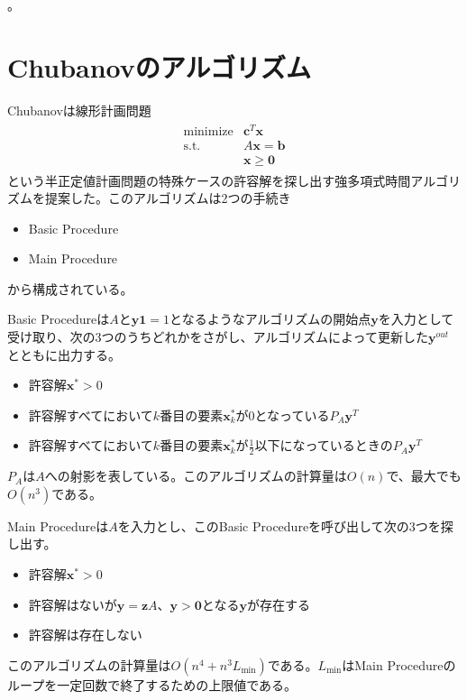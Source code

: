 。

\section{Chubanovのアルゴリズム}
Chubanovは線形計画問題
\begin{align*}
  \begin{array}{ll}
    \text{minimize} & \mathbf{c}^T \mathbf{x} \\
    \text{s.t.}     & A \mathbf{x} = \mathbf{b} \\
                    & \mathbf{x} \geq \mathbf{0}
  \end{array}
\end{align*}
という半正定値計画問題の特殊ケースの許容解を探し出す強多項式時間アルゴリズムを提案した。このアルゴリズムは2つの手続き
\begin{itemize}
  \item Basic Procedure
  \item Main Procedure
\end{itemize}
から構成されている。

Basic Procedureは$A$と$\mathbf{y} \mathbf{1} = 1$となるようなアルゴリズムの開始点$\mathbf{y}$を入力として受け取り、次の3つのうちどれかをさがし、アルゴリズムによって更新した$\mathbf{y}^{out}$とともに出力する。
\begin{itemize}
  \item 許容解$\mathbf{x}^* > 0$
  \item 許容解すべてにおいて$k$番目の要素$\mathbf{x}_k^*$が$0$となっている$P_A \mathbf{y}^T$
  \item 許容解すべてにおいて$k$番目の要素$\mathbf{x}_k^*$が$\frac{1}{2}$以下になっているときの$P_A \mathbf{y}^T$
\end{itemize}
$P_A$は$A$への射影を表している。このアルゴリズムの計算量は$O(n)$で、最大でも$O(n^3)$である。

Main Procedureは$A$を入力とし、このBasic Procedureを呼び出して次の3つを探し出す。
\begin{itemize}
  \item 許容解$\mathbf{x}^* > 0$
  \item 許容解はないが$\mathbf{y} = \mathbf{z} A、\mathbf{y} > \mathbf{0}$となる$\mathbf{y}$が存在する
  \item 許容解は存在しない
\end{itemize}
このアルゴリズムの計算量は$O(n^4 + n^3 L_{\text{min}})$である。$L_{\text{min}}$はMain Procedureのループを一定回数で終了するための上限値である。

